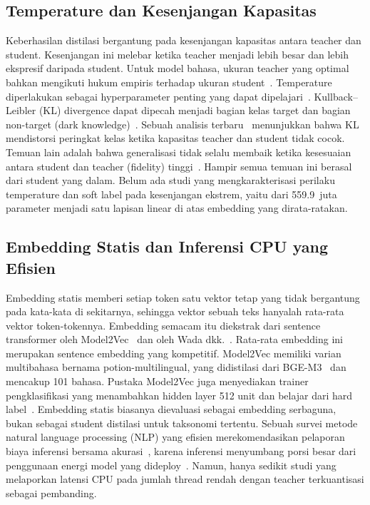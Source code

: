 \documentclass[journal]{IEEEtran}
\begin{document}
\subsection{Temperature dan Kesenjangan Kapasitas}
Keberhasilan distilasi bergantung pada kesenjangan kapasitas antara teacher dan student. Kesenjangan ini melebar ketika teacher menjadi lebih besar dan lebih ekspresif daripada student. Untuk model bahasa, ukuran teacher yang optimal bahkan mengikuti hukum empiris terhadap ukuran student~\cite{zhang2025law}. Temperature diperlakukan sebagai hyperparameter penting yang dapat dipelajari~\cite{li2023ctkd}. Kullback--Leibler (KL) divergence dapat dipecah menjadi bagian kelas target dan bagian non-target (dark knowledge)~\cite{zhao2022dkd}. Sebuah analisis terbaru~\cite{wang2026rckd} menunjukkan bahwa KL mendistorsi peringkat kelas ketika kapasitas teacher dan student tidak cocok. Temuan lain adalah bahwa generalisasi tidak selalu membaik ketika kesesuaian antara student dan teacher (fidelity) tinggi~\cite{stanton2021kd}. Hampir semua temuan ini berasal dari student yang dalam. Belum ada studi yang mengkarakterisasi perilaku temperature dan soft label pada kesenjangan ekstrem, yaitu dari 559.9~juta parameter menjadi satu lapisan linear di atas embedding yang dirata-ratakan.

\subsection{Embedding Statis dan Inferensi CPU yang Efisien}
Embedding statis memberi setiap token satu vektor tetap yang tidak bergantung pada kata-kata di sekitarnya, sehingga vektor sebuah teks hanyalah rata-rata vektor token-tokennya. Embedding semacam itu diekstrak dari sentence transformer oleh Model2Vec~\cite{tulkens2024model2vec} dan oleh Wada dkk.~\cite{wada2025static}. Rata-rata embedding ini merupakan sentence embedding yang kompetitif. Model2Vec memiliki varian multibahasa bernama potion-multilingual, yang didistilasi dari BGE-M3~\cite{chen2024bgem3} dan mencakup 101 bahasa. Pustaka Model2Vec juga menyediakan trainer pengklasifikasi yang menambahkan hidden layer 512 unit dan belajar dari hard label~\cite{tulkens2024model2vec}. Embedding statis biasanya dievaluasi sebagai embedding serbaguna, bukan sebagai student distilasi untuk taksonomi tertentu. Sebuah survei metode natural language processing (NLP) yang efisien merekomendasikan pelaporan biaya inferensi bersama akurasi~\cite{treviso2023efficient}, karena inferensi menyumbang porsi besar dari penggunaan energi model yang dideploy~\cite{luccioni2024power}. Namun, hanya sedikit studi yang melaporkan latensi CPU pada jumlah thread rendah dengan teacher terkuantisasi sebagai pembanding.
\end{document}
